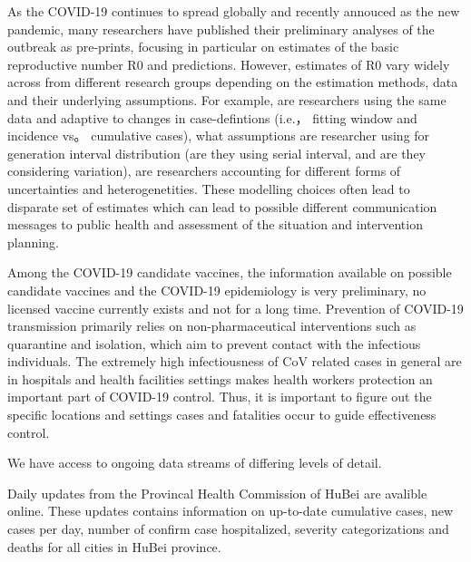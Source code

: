 

As the COVID-19 continues to spread globally and recently annouced as the new pandemic, many researchers have published their preliminary analyses of the outbreak as pre-prints, focusing in particular on estimates of the basic reproductive number R0 and predictions.
However, estimates of R0 vary widely across from different research groups depending on the estimation methods, data and their underlying assumptions.
For example, are researchers using the same data and adaptive to changes in case-defintions (i.e.， fitting window and incidence vs。 cumulative cases), what assumptions are researcher using for generation interval distribution (are they using serial interval, and are they considering variation), are researchers accounting for different forms of uncertainties and heterogenetities.
These modelling choices often lead to disparate set of estimates which can lead to possible different communication messages to public health and assessment of the situation and intervention planning.

Among the COVID-19 candidate vaccines, the information available on possible candidate vaccines and the
COVID-19 epidemiology is very preliminary, no licensed vaccine currently exists and not for a long time. 
Prevention of COVID-19 transmission primarily relies on non-pharmaceutical interventions such as quarantine and isolation, which aim to prevent contact with the infectious individuals. 
The extremely high infectiousness of CoV related cases in general are in hospitals and health facilities settings makes health workers protection an important part of COVID-19 control. 
Thus, it is important to figure out the specific locations and settings cases and fatalities occur to guide effectiveness control. 




We have access to ongoing data streams of differing levels of detail. 

Daily updates from the Provincal Health Commission of HuBei are avalible online.
These updates contains information on up-to-date cumulative cases, new cases per day, number of confirm case hospitalized, severity categorizations and deaths for all cities in HuBei province.

